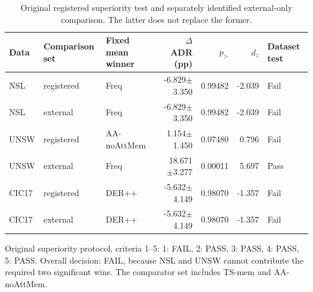 \begin{table}[t]
\centering\scriptsize
\setlength{\tabcolsep}{3.8pt}
\caption{Original registered superiority test and separately identified external-only comparison. The latter does not replace the former.}\label{tab:registered-criteria}
\begin{tabular}{lllrrrl}
\toprule
Data & Comparison set & Fixed mean winner & $\Delta$ ADR (pp) & $p_{>}$ & $d_z$ & Dataset test \\
\midrule
NSL & registered & Freq & -6.829$\pm$3.350 & 0.99482 & -2.039 & Fail \\
NSL & external & Freq & -6.829$\pm$3.350 & 0.99482 & -2.039 & Fail \\
UNSW & registered & AA-noAttMem & 1.154$\pm$1.450 & 0.07480 & 0.796 & Fail \\
UNSW & external & Freq & 18.671$\pm$3.277 & 0.00011 & 5.697 & Pass \\
CIC17 & registered & DER++ & -5.632$\pm$4.149 & 0.98070 & -1.357 & Fail \\
CIC17 & external & DER++ & -5.632$\pm$4.149 & 0.98070 & -1.357 & Fail \\
\bottomrule
\end{tabular}
\par\vspace{2pt}\begin{minipage}{.98\linewidth}\footnotesize Original superiority protocol, criteria 1--5: 1: FAIL, 2: PASS, 3: PASS, 4: PASS, 5: PASS. Overall decision: FAIL, because NSL and UNSW cannot contribute the required two significant wins. The comparator set includes TS-mem and AA-noAttMem.\end{minipage}
\end{table}

